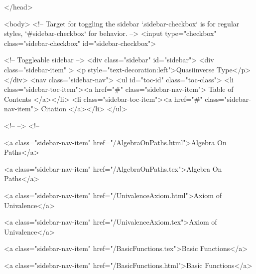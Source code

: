   
</head>




  <body>
    <!-- Target for toggling the sidebar `.sidebar-checkbox` is for regular
     styles, `#sidebar-checkbox` for behavior. -->
<input type="checkbox" class="sidebar-checkbox" id="sidebar-checkbox">

<!-- Toggleable sidebar -->
<div class="sidebar" id="sidebar">
  <div class="sidebar-item" >
    <p style="text-decoration:left">Quasiinverse Type</p>
  </div>
  <nav class="sidebar-nav">
    <ul id="toc-id" class="toc-class">
  <li class="sidebar-toc-item"><a href="#" class="sidebar-nav-item"> Table of Contents </a></li>
  <li class="sidebar-toc-item"><a href="#" class="sidebar-nav-item"> Citation </a></li>
</ul>


    <!--  -->
    <!-- 
      
    
      
    
      
    
      
        
      
    
      
        
          <a class="sidebar-nav-item" href="/AlgebraOnPaths.html">Algebra On Paths</a>
        
      
    
      
        
          <a class="sidebar-nav-item" href="/AlgebraOnPaths.tex">Algebra On Paths</a>
        
      
    
      
        
          <a class="sidebar-nav-item" href="/UnivalenceAxiom.html">Axiom of Univalence</a>
        
      
    
      
        
          <a class="sidebar-nav-item" href="/UnivalenceAxiom.tex">Axiom of Univalence</a>
        
      
    
      
        
          <a class="sidebar-nav-item" href="/BasicFunctions.tex">Basic Functions</a>
        
      
    
      
        
          <a class="sidebar-nav-item" href="/BasicFunctions.html">Basic Functions</a>
        
      
    
      
        
